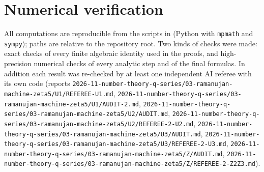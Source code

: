 \documentclass[11pt]{amsart}
\theoremstyle{definition}
\theoremstyle{remark}
\numberwithin{equation}{section}
\newcommand{\file}[1]{\nolinkurl{2026-11-number-theory-q-series/03-ramanujan-machine-zeta5/#1}}
\begin{document}
\section{Numerical verification}\label{sec:num}

All computations are reproducible from the scripts in \cite{code} (Python with \texttt{mpmath} and \texttt{sympy}); paths are relative to the repository root. Two kinds of checks were made: exact checks of every finite algebraic identity used in the proofs, and high-precision numerical checks of every analytic step and of the final formulas. In addition each result was re-checked by at least one independent AI referee with its own code (reports \file{U1/REFEREE-U1.md}, \file{U1/AUDIT-2.md}, \file{U2/AUDIT.md}, \file{U2/REFEREE-2-U2.md}, \file{U3/AUDIT.md}, \file{U3/REFEREE-2-U3.md}, \file{Z/AUDIT.md}, \file{Z/REFEREE-2-Z2Z3.md}).
\end{document}
